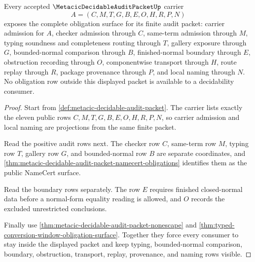 \begin{theorem}
\label{thm:metacic-decidable-audit-packet-obligation-closure-surface}
Every accepted $\MetacicDecidableAuditPacketUp$ carrier
$$
A=(C,M,T,G,B,E,O,H,R,P,N)
$$
exposes the complete obligation surface for its finite audit packet: carrier admission for $A$, checker admission through $C$, same-term admission through $M$, typing soundness and completeness routing through $T$, gallery exposure through $G$, bounded-normal comparison through $B$, finished-normal boundary through $E$, obstruction recording through $O$, componentwise transport through $H$, route replay through $R$, package provenance through $P$, and local naming through $N$. No obligation row outside this displayed packet is available to a decidability consumer.
\end{theorem}
\begin{proof}
Start from \autoref{def:metacic-decidable-audit-packet}. The carrier lists exactly the eleven public rows $C,M,T,G,B,E,O,H,R,P,N$, so carrier admission and local naming are projections from the same finite packet.

Read the positive audit rows next. The checker row $C$, same-term row $M$, typing row $T$, gallery row $G$, and bounded-normal row $B$ are separate coordinates, and \autoref{thm:metacic-decidable-audit-packet-namecert-obligations} identifies them as the public NameCert surface.

Read the boundary rows separately. The row $E$ requires finished closed-normal data before a normal-form equality reading is allowed, and $O$ records the excluded unrestricted conclusions.

Finally use \autoref{thm:metacic-decidable-audit-packet-nonescape} and \autoref{thm:typed-conversion-window-obligation-surface}. Together they force every consumer to stay inside the displayed packet and keep typing, bounded-normal comparison, boundary, obstruction, transport, replay, provenance, and naming rows visible.
\end{proof}

